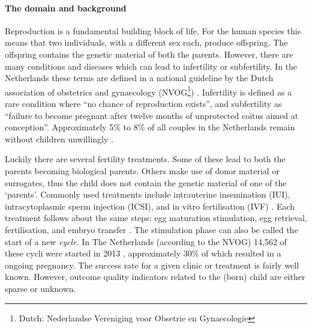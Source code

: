 \paragraph{The domain and background}
Reproduction is a fundamental building block of life.
For the human species this means that two individuals, with a different sex each, produce offspring.
The offspring contains the genetic material of both the parents.
However, there are many conditions and diseases which can lead to infertility or subfertility.
In the Netherlands these terms are defined in a national guideline by the Dutch association of obstetrics and gynaecology (NVOG\footnote{Dutch: Nederlandse Vereniging voor Obsetrie en Gynaecologie}) \cite{subfertilityGuideline}.
Infertility is defined as a rare condition where ``no chance of reproduction exists'', 
and subfertility as ``failure to become pregnant after twelve months of unprotected coitus aimed at conception''.
Approximately 5\% to 8\% of all couples in the Netherlands remain without children unwillingly \cite{cbsStatistics, nhgStatistics}.

Luckily there are several fertility treatments.
Some of these lead to both the parents becoming biological parents. 
Others make use of donor material or surrogates, thus the child does not contain the genetic material of one of the `parents'.
Commonly used treatments include intrauterine insemination (IUI), intracytoplasmic sperm injection (ICSI), and in vitro fertilisation (IVF) \cite{treatmentExplanation}.
Each treatment follows about the same steps: egg maturation stimulation, egg retrieval, fertilisation, and embryo transfer \cite{treatmentExplanation}.
The stimulation phase can also be called the start of a new \emph{cycle}. In The Netherlands (according to the NVOG) 14,562 of these cycli were started in 2013 \cite{ivfReportNVOG2013}, approximately 30\% of which resulted in a ongoing pregnancy.
The success rate for a given clinic or treatment is fairly well known.
However, outcome quality indicators related to the (born) child are either sparse or unknown.

